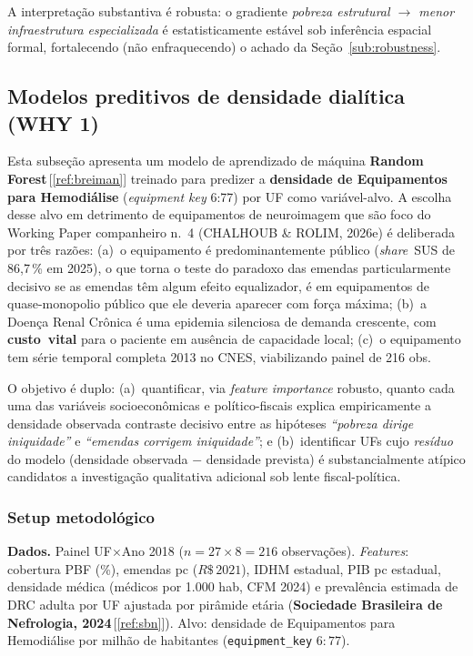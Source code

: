 \documentclass[12pt,a4paper,oneside]{article}
\newcommand{\rs}{R\$\,}
\begin{document}
A interpretação substantiva é robusta: o gradiente
\textit{pobreza estrutural $\to$ menor infraestrutura
especializada} é estatisticamente estável sob inferência espacial
formal, fortalecendo (não enfraquecendo) o achado da
Seção~\ref{sub:robustness}.

\subsection{Modelos preditivos de densidade dialítica
(WHY 1)}\label{sub:ml-preditivo}

Esta subseção apresenta um modelo de aprendizado de máquina
\textbf{Random Forest}\,[\ref{ref:breiman}] treinado para predizer
a \textbf{densidade de Equipamentos para Hemodiálise} (\textit{equipment
key} 6{:}77) por UF como variável-alvo. A escolha desse alvo
\textemdash{} em detrimento de equipamentos de neuroimagem que são
foco do Working Paper companheiro n.~4 (CHALHOUB \& ROLIM, 2026e)
\textemdash{} é deliberada por três razões: (a)~o equipamento é
predominantemente público (\textit{share}~SUS de 86,7\,\% em 2025),
o que torna o teste do paradoxo das emendas
particularmente decisivo \textemdash{} se as emendas têm algum
efeito equalizador, é em equipamentos de quase-monopolio público
que ele deveria aparecer com força máxima; (b)~a Doença Renal
Crônica é uma epidemia silenciosa de demanda crescente, com
\textbf{custo~vital} para o paciente em ausência de capacidade
local; (c)~o equipamento tem série temporal completa
2013 no CNES, viabilizando painel de 216 obs.

O objetivo é duplo: (a)~quantificar, via \textit{feature importance}
robusto, quanto cada uma das variáveis socioeconômicas e
político-fiscais explica empiricamente a densidade observada
\textemdash{} contraste decisivo entre as hipóteses
\textit{``pobreza dirige iniquidade''} e \textit{``emendas
corrigem iniquidade''}; e (b)~identificar UFs cujo \textit{resíduo}
do modelo (densidade observada $-$ densidade prevista) é
substancialmente atípico \textemdash{} candidatos a investigação
qualitativa adicional sob lente fiscal-política.

\subsubsection{Setup metodológico}

\textbf{Dados.} Painel UF$\times$Ano 2018
($n=27 \times 8 = 216$ observações). \textit{Features}: cobertura
PBF (\%), emendas pc ($\rs2021$), IDHM estadual, PIB pc estadual,
densidade médica (médicos por 1.000 hab, CFM 2024) e prevalência
estimada de DRC adulta por UF ajustada por pirâmide etária
(\textbf{Sociedade Brasileira de Nefrologia, 2024}\,[\ref{ref:sbn}]).
Alvo: densidade de Equipamentos para Hemodiálise por milhão de
habitantes (\texttt{equipment\_key} $6{:}77$).
\end{document}
